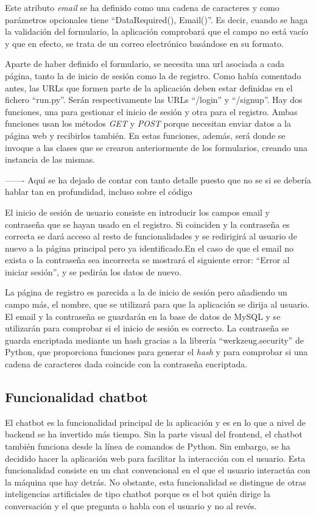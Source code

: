 Este atributo \textit{email} se ha definido como una cadena de caracteres y como parámetros opcionales tiene ``DataRequired(), Email()''. Es decir, cuando se haga la validación del formulario, la aplicación comprobará que el campo no está vacío y que en efecto, se trata de un correo electrónico basándose en su formato. 

Aparte de haber definido el formulario, se necesita una url asociada a cada página, tanto la de inicio de sesión como la de registro. Como había comentado antes, las URLs que formen parte de la aplicación deben estar definidas en el fichero ``run.py''. Serán respectivamente las URLs ``/login'' y ``/signup''. Hay dos funciones, una para gestionar el inicio de sesión y otra para el registro. Ambas funciones usan los métodos \textit{GET} y \textit{POST} porque necesitan enviar datos a la página web y recibirlos también. En estas funciones, además, será donde se invoque a las clases que se crearon anteriormente de los formularios, creando una instancia de las mismas.

------- Aquí se ha dejado de contar con tanto detalle puesto que no se si se debería hablar tan en profundidad, incluso sobre el código

El inicio de sesión de usuario consiste en introducir los campos email y contraseña que se hayan usado en el registro. Si coinciden y la contraseña es correcta se dará acceso al resto de funcionalidades y se redirigirá al usuario de nuevo a la página principal pero ya identificado.En el caso de que el email no exista o la contraseña sea incorrecta se mostrará el siguiente error: ``Error al iniciar sesión'', y se pedirán los datos de nuevo.

La página de registro es parecida a la de inicio de sesión pero añadiendo un campo más, el nombre, que se utilizará para que la aplicación se dirija al usuario. El email y la contraseña se guardarán en la base de datos de MySQL y se utilizarán para comprobar si el inicio de sesión es correcto. La contraseña se guarda encriptada mediante un hash gracias a la librería ``werkzeug.security'' de Python, que proporciona funciones para generar el \textit{hash} y para comprobar si una cadena de caracteres dada coincide con la contraseña encriptada.

\subsection{Funcionalidad chatbot}

El chatbot es la funcionalidad principal de la aplicación y es en lo que a nivel de backend se ha invertido más tiempo. Sin la parte visual del frontend, el chatbot también funciona desde la línea de comandos de Python. Sin embargo, se ha decidido hacer la aplicación web para facilitar la interacción con el usuario. Esta funcionalidad consiste en un chat convencional en el que el usuario interactúa con la máquina que hay detrás. No obstante, esta funcionalidad se distingue de otras inteligencias artificiales de tipo chatbot porque es el bot quién dirige la conversación y el que pregunta o habla con el usuario y no al revés. 


